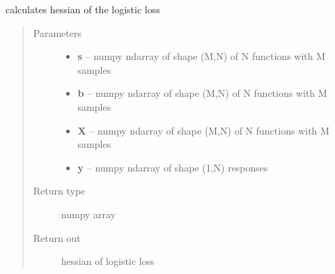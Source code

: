\documentclass[letterpaper,10pt,english]{sphinxmanual}
\begin{document}
\begin{fulllineitems}
\label{regression:regression.logit_hessian}
calculates hessian of the logistic loss
\begin{quote}\begin{description}
\item[{Parameters}] \leavevmode\begin{itemize}
\item {} 
\textbf{s} -- numpy ndarray of shape (M,N) of N functions with M samples

\item {} 
\textbf{b} -- numpy ndarray of shape (M,N) of N functions with M samples

\item {} 
\textbf{X} -- numpy ndarray of shape (M,N) of N functions with M samples

\item {} 
\textbf{y} -- numpy ndarray of shape (1,N) responses

\end{itemize}

\item[{Return type}] \leavevmode
numpy array

\item[{Return out}] \leavevmode
hessian of logistic loss

\end{description}\end{quote}

\end{fulllineitems}

\end{document}
